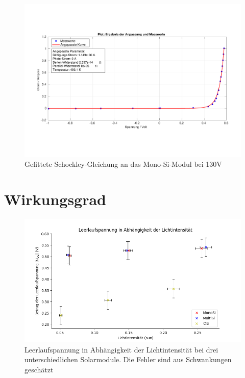 \begin{figure}[ht]
    \centering
    \includegraphics[width = \linewidth]{Bilder/SiMultiDunkelPlot.pdf}
    \caption{Gefittete Schockley-Gleichung an das Mono-Si-Modul bei 130V}
\end{figure}
\clearpage


\section{Wirkungsgrad}
\label{section:AnhangWirkungsgrad}

\begin{figure}[ht]
    \centering
    \includegraphics[width = \linewidth]{Bilder/UOCInt.png}
    \caption{Leerlaufspannung in Abhängigkeit der Lichtintensität bei drei unterschiedlichen Solarmodule. Die Fehler 
    sind aus Schwankungen geschätzt}
\end{figure}


